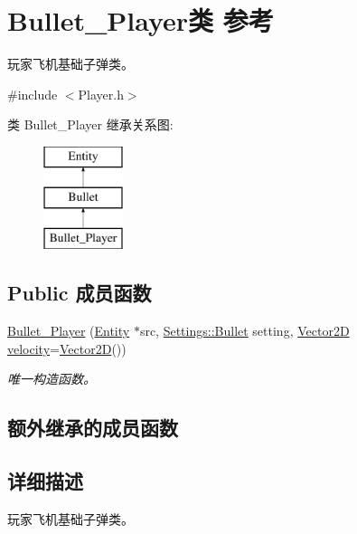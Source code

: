 \hypertarget{class_bullet___player}{}\section{Bullet\+\_\+\+Player类 参考}
\label{class_bullet___player}


玩家飞机基础子弹类。  




{\ttfamily \#include $<$Player.\+h$>$}

类 Bullet\+\_\+\+Player 继承关系图\+:\begin{figure}[H]
\begin{center}
\leavevmode
\includegraphics[height=3.000000cm]{class_bullet___player}
\end{center}
\end{figure}
\subsection*{Public 成员函数}
\begin{DoxyCompactItemize}
\item 
\hyperlink{class_bullet___player_abcb87ef10b028f5fd603c70b4cda20d3}{Bullet\+\_\+\+Player} (\hyperlink{class_entity}{Entity} $\ast$src, \hyperlink{struct_settings_1_1_bullet}{Settings\+::\+Bullet} setting, \hyperlink{structbasic__vector2_d}{Vector2D} \hyperlink{class_entity_a386d25b56772b8913eb3e5adc636f6e0}{velocity}=\hyperlink{structbasic__vector2_d}{Vector2D}())
\begin{DoxyCompactList}\small\item\em 唯一构造函数。 \end{DoxyCompactList}\end{DoxyCompactItemize}
\subsection*{额外继承的成员函数}


\subsection{详细描述}
玩家飞机基础子弹类。 

